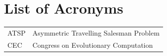 \chapter*{List of Acronyms}

\begin{table}[ht!]
		\begin{tabular}{ll}
			ATSP&Asymmetric Travelling Salesman Problem\\
			CEC&Congress on Evolutionary Computation\\
		\end{tabular}
\end{table}